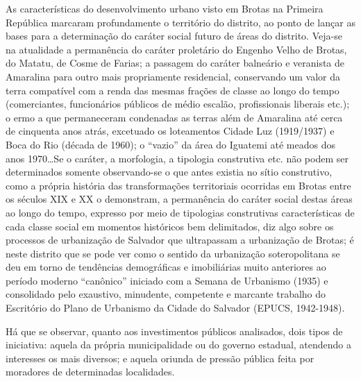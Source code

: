 As características do desenvolvimento urbano visto em Brotas na Primeira República marcaram profundamente o território do distrito, ao ponto de lançar as bases para a determinação do caráter social futuro de áreas do distrito. Veja-se na atualidade a permanência do caráter proletário do Engenho Velho de Brotas, do Matatu, de Cosme de Farias; a passagem do caráter balneário e veranista de Amaralina para outro mais propriamente residencial, conservando um valor da terra compatível com a renda das mesmas frações de classe ao longo do tempo (comerciantes, funcionários públicos de médio escalão, profissionais liberais etc.); o ermo a que permaneceram condenadas as terras além de Amaralina até cerca de cinquenta anos atrás, excetuado os loteamentos Cidade Luz (1919/1937) e Boca do Rio (década de 1960); o ``vazio'' da área do Iguatemi até meados dos anos 1970\dots Se o caráter, a morfologia, a tipologia construtiva etc. não podem ser determinados somente observando-se o que antes existia no sítio construtivo, como a própria história das transformações territoriais ocorridas em Brotas entre os séculos XIX e XX o demonstram, a permanência do caráter social destas áreas ao longo do tempo, expresso por meio de tipologias construtivas características de cada classe social em momentos históricos bem delimitados, diz algo sobre os processos de urbanização de Salvador que ultrapassam a urbanização de Brotas; é neste distrito que se pode ver como o sentido da urbanização soteropolitana se deu em torno de tendências demográficas e imobiliárias muito anteriores ao período moderno ``canônico'' iniciado com a Semana de Urbanismo (1935) e consolidado pelo exaustivo, minudente, competente e marcante trabalho do Escritório do Plano de Urbanismo da Cidade do Salvador (EPUCS, 1942-1948).

Há que se observar, quanto aos investimentos públicos analisados, dois tipos de iniciativa: aquela da própria municipalidade ou do governo estadual, atendendo a interesses os mais diversos; e aquela oriunda de pressão pública feita por moradores de determinadas localidades.

